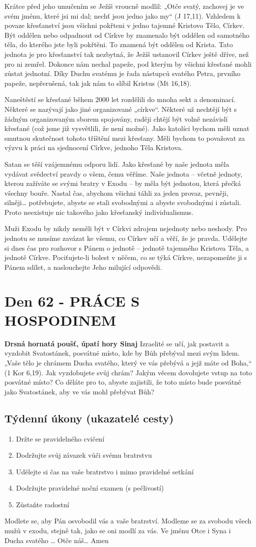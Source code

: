 \documentclass[11pt]{article}
\newcommand{\zacatekDevatyTyden}{
\textbf{Drsná hornatá poušť, úpatí hory Sinaj} \newline 
Izraelité se učí, jak postavit a vyzdobit Svatostánek, posvátné místo, kde by Bůh přebýval mezi svým lidem. „Vaše tělo je chrámem Ducha svatého, který ve vás přebývá a jejž máte od Boha,“ (1 Kor 6,19). Jak vyzdobujete svůj chrám? Jakým věcem dovolujete vstup na toto posvátné místo? Co děláte pro to, abyste zajistili, že toto místo bude posvátné jako Svatostánek, aby ve vás mohl přebývat Bůh?

\subsection*{Týdenní úkony (ukazatelé cesty)}
\begin{enumerate}
  \item Držte se pravidelného cvičení
  \item Dodržujte svůj závazek vůči svému bratrstvu
  \item Udělejte si čas na vaše bratrstvo i mimo pravidelné setkání
  \item Dodržujte pravidelné noční examen (s pečlivostí)
  \item Zůstaňte radostní
\end{enumerate}
Modlete se, aby Pán osvobodil vás a vaše bratrství. \newline
Modleme se za svobodu všech mužů v exodu, stejně tak, jako se oni modlí za vás.\newline
Ve jménu Otce i Syna i Ducha svatého …  Otče náš… Amen
}
\begin{document}
Krátce před jeho umučením se Ježíš vroucně modlil: „Otče svatý, zachovej je ve svém jménu, které jsi mi
dal; nechť jsou jedno jako my“ (J 17,11). Vzhledem k povaze křesťanství jsou všichni pokřteni v jedno
tajemné Kristovo Tělo, Církev. Být oddělen nebo odpadnout od Církve by znamenalo být oddělen od
samotného těla, do kterého jste byli pokřtěni. To znamená být oddělen od Krista. Tato jednota je pro
křesťanství tak nezbytná, že Ježíš ustanovil Církev ještě dříve, než pro ni zemřel. Dokonce nám nechal
papeže, pod kterým by všichni křesťané mohli zůstat jednotní. Díky Duchu svatému je řada nástupců svatého
Petra, prvního papeže, nepřerušená, tak jak nám to slíbil Kristus (Mt 16,18).

Naneštěstí se křesťané během 2000 let rozdělili do mnoha sekt a denominací. Některé se nazývají jako jiné
organizované „církve“. Některé už nechtějí být s žádným organizovaným sborem spojovány, raději chtějí být
volně nezávislí křesťané (což jsme již vysvětlili, že není možné). Jako katolíci bychom měli uznat smutnou
skutečnost tohoto tříštění mezi křesťany. Měli bychom to považovat za výzvu k práci na sjednocení Církve,
jednoho Těla Kristova.

Satan se těší vzájemnému odporu lidí. Jako křesťané by naše jednota měla vydávat svědectví pravdy o všem,
čemu věříme. Naše jednota – včetně jednoty, kterou zažíváte se svými bratry v Exodu – by měla být
jednotou, která přečká všechny bouře. Nastal čas, abychom všichni táhli za jeden provaz, pevněji, silněji…
potřebujete, abyste se stali svobodnými a abyste svobodnými i zůstali. Proto neexistuje nic takového jako
křesťanský individualismus.

Muži Exodu by nikdy neměli být v Církvi zdrojem nejednoty nebo neshody. Pro jednotu se musíme zavázat
ke všemu, co Církev učí a věří, že je pravda. Udělejte si dnes čas pro rozhovor s Pánem o jednotě – jednotě
tajemného Kristova Těla, a jednotě Církve. Pociťujete-li bolest v něčem, co se týká Církve, nezapomeňte ji
s Pánem sdílet, a naslouchejte Jeho milující odpovědi.


\newpage
\section{Den 62 - PRÁCE S HOSPODINEM }
\zacatekDevatyTyden
\end{document}
